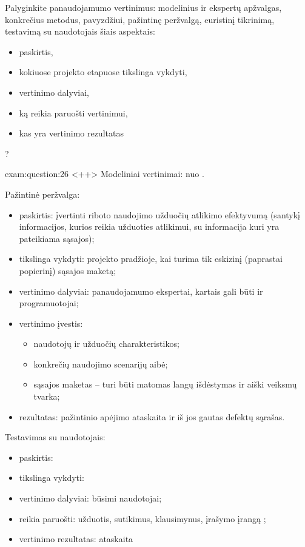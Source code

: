 \begin{question}{%
  Palyginkite panaudojamumo vertinimus: modelinius ir ekspertų apžvalgas,
  konkrečius metodus, pavyzdžiui, pažintinę peržvalgą, euristinį
  tikrinimą, testavimą su naudotojais šiais aspektais:
  \begin{itemize}
    \item paskirtis,
    \item kokiuose projekto etapuose tikslinga vykdyti,
    \item vertinimo dalyviai,
    \item ką reikia paruošti vertinimui,
    \item kas yra vertinimo rezultatas
  \end{itemize}
  ?
  }{exam:question:26}
  <++>
  Modeliniai vertinimai: nuo \cite[42]{skaidres-8}.

  Pažintinė peržvalga:
  \begin{itemize}
    \item paskirtis: įvertinti riboto naudojimo užduočių atlikimo
      efektyvumą (santykį informacijos, kurios reikia užduoties
      atlikimui, su informacija kuri yra pateikiama sąsajos);
    \item tikslinga vykdyti: projekto pradžioje, kai turima tik eskizinį
      (paprastai popierinį) sąsajos maketą;
    \item vertinimo dalyviai: panaudojamumo ekspertai, kartais gali būti
      ir programuotojai;
    \item vertinimo įvestis:
      \begin{itemize}
        \item naudotojų ir užduočių charakteristikos;
        \item konkrečių naudojimo scenarijų aibė;
        \item sąsajos maketas – turi būti matomas langų išdėstymas ir
          aiški veiksmų tvarka;
      \end{itemize}
    \item rezultatas: pažintinio apėjimo ataskaita ir iš jos gautas
      defektų sąrašas.
  \end{itemize}

  Testavimas su naudotojais:
  \begin{itemize}
    \item paskirtis:
    \item tikslinga vykdyti:
    \item vertinimo dalyviai: būsimi naudotojai;
    \item reikia paruošti: užduotis, sutikimus, klausimynus, įrašymo
      įrangą \cite[13]{skaidres-10};
    \item vertinimo rezultatas: ataskaita\cite[27--29]{skaidres-10}
  \end{itemize}


\end{question}
